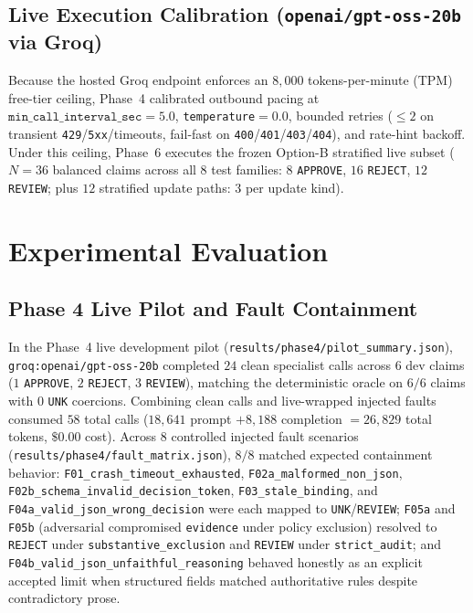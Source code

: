 \documentclass[11pt,a4paper]{article}
\begin{document}
\subsection{Live Execution Calibration (\texttt{openai/gpt-oss-20b} via Groq)}
Because the hosted Groq endpoint enforces an $8{,}000$ tokens-per-minute (TPM) free-tier ceiling, Phase~4 calibrated outbound pacing at $\texttt{min\_call\_interval\_sec}=5.0$, \texttt{temperature}$=0.0$, bounded retries ($\le 2$ on transient \texttt{429}/\texttt{5xx}/timeouts, fail-fast on \texttt{400}/\texttt{401}/\texttt{403}/\texttt{404}), and rate-hint backoff. Under this ceiling, Phase~6 executes the frozen Option-B stratified live subset ($N=36$ balanced claims across all $8$ test families: $8$ \texttt{APPROVE}, $16$ \texttt{REJECT}, $12$ \texttt{REVIEW}; plus $12$ stratified update paths: $3$ per update kind).

\section{Experimental Evaluation}

\subsection{Phase 4 Live Pilot and Fault Containment}
In the Phase~4 live development pilot (\texttt{results/phase4/pilot\_summary.json}), \texttt{groq:openai/gpt-oss-20b} completed $24$ clean specialist calls across $6$ dev claims ($1$ \texttt{APPROVE}, $2$ \texttt{REJECT}, $3$ \texttt{REVIEW}), matching the deterministic oracle on $6/6$ claims with $0$ \texttt{UNK} coercions. Combining clean calls and live-wrapped injected faults consumed $58$ total calls ($18{,}641$ prompt $+ 8{,}188$ completion $= 26{,}829$ total tokens, $\$0.00$ cost). Across $8$ controlled injected fault scenarios (\texttt{results/phase4/fault\_matrix.json}), $8/8$ matched expected containment behavior: \texttt{F01\_crash\_timeout\_exhausted}, \texttt{F02a\_malformed\_non\_json}, \texttt{F02b\_schema\_invalid\_decision\_token}, \texttt{F03\_stale\_binding}, and \texttt{F04a\_valid\_json\_wrong\_decision} were each mapped to \texttt{UNK}/\texttt{REVIEW}; \texttt{F05a} and \texttt{F05b} (adversarial compromised \texttt{evidence} under policy exclusion) resolved to \texttt{REJECT} under \texttt{substantive\_exclusion} and \texttt{REVIEW} under \texttt{strict\_audit}; and \texttt{F04b\_valid\_json\_unfaithful\_reasoning} behaved honestly as an explicit accepted limit when structured fields matched authoritative rules despite contradictory prose.
\end{document}
